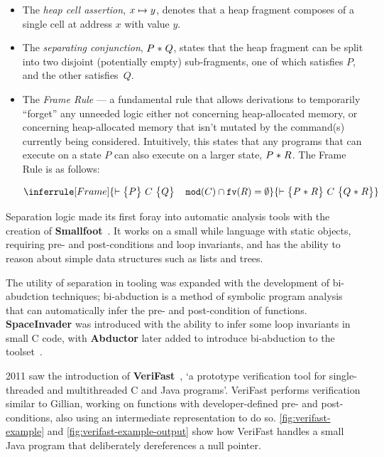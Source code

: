 \begin{itemize}
  \item The \textit{heap cell assertion}, $x \mapsto y$, denotes that a heap
  fragment composes of a single cell at address $x$ with value $y$.

  \item The \textit{separating conjunction}, $P \mathrel{*} Q$, states that the heap
  fragment can be split into two disjoint (potentially empty) sub-fragments,
  one of which satisfies $P$, and the other satisfies~$Q$.

  \item The \textit{Frame Rule} --- a fundamental rule that allows derivations
  to temporarily ``forget'' any unneeded logic either not concerning
  heap-allocated memory, or concerning heap-allocated memory that isn't mutated
  by the command(s) currently being considered. Intuitively, this states that
  any programs that can execute on a state $P$ can also execute on a larger
  state, $P \mathrel{*} R$. The Frame Rule is as follows:

  \[
    \inferrule[Frame]{
      \triple{P}{C}{Q} \quad \mathtt{mod}(C) \cap \mathtt{fv}(R) =  %
      \emptyset}{\triple{P \lstar R}{C}{Q \lstar R}
    }
  \]
\end{itemize}


Separation logic made its first foray into automatic analysis tools with the
creation of \textbf{Smallfoot}~\cite{smallfoot-paper, smallfoot-site}. It works
on a small while language with static objects, requiring pre- and
post-conditions and loop invariants, and has the ability to reason about simple
data structures such as lists and trees.

The utility of separation in tooling was expanded with the development of
bi-abudction techniques; bi-abduction is a method of symbolic program analysis
that can automatically infer the pre- and post-condition of functions.
\textbf{SpaceInvader} was introduced with the ability to infer some loop
invariants in small C code, with \textbf{Abductor} later added to introduce
bi-abduction to the toolset~\cite{abductor}.

2011 saw the introduction of \textbf{VeriFast}~\cite{verifast-paper,
  verifast-repo}, `a prototype verification tool for single-threaded and
multithreaded C and Java programs'. VeriFast performs verification similar to
Gillian, working on functions with developer-defined pre- and post-conditions,
also using an intermediate representation to do so.
\autoref{fig:verifast-example} and \autoref{fig:verifast-example-output} show
how VeriFast handles a small Java program that deliberately dereferences a null
pointer.

